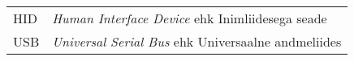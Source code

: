 \begin{longtable}{p{3cm}p{10cm}}
HID&\textit{Human Interface Device} ehk Inimliidesega seade\\
USB&\textit{Universal Serial Bus} ehk Universaalne andmeliides\\
\end{longtable}
\addtocounter{table}{-1} 
